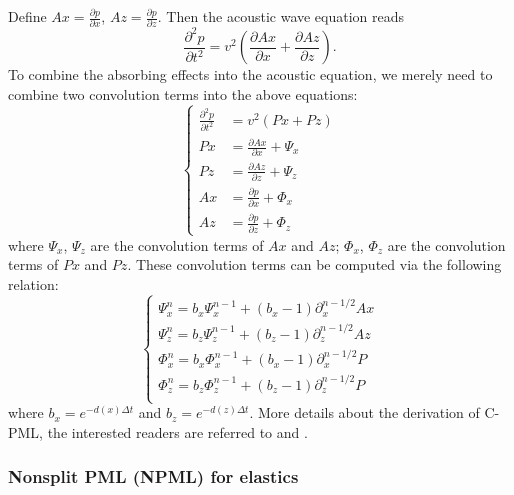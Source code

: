 Define $Ax=\frac{\partial p}{\partial x}$, $Az=\frac{\partial p}{\partial z}$. Then the acoustic wave equation reads
\begin{displaymath}
\frac{\partial^2 p}{\partial t^2}=v^2\left(\frac{\partial Ax}{\partial x}+\frac{\partial Az}{\partial z}\right).
\end{displaymath}
To combine the absorbing effects into the acoustic equation, we merely need to combine two convolution terms into the above equations:
\begin{equation}
\left\{
\begin{split}
\frac{\partial^2 p}{\partial t^2}&=v^2\left(Px+Pz\right)\\
Px&=\frac{\partial Ax}{\partial x}+\Psi_x\\
Pz&=\frac{\partial Az}{\partial z}+\Psi_z\\
Ax&=\frac{\partial p}{\partial x}+\Phi_x\\
Az&=\frac{\partial p}{\partial z}+\Phi_z
\end{split}
\right.
\end{equation}
where $\Psi_x$, $\Psi_z$ are the convolution terms of $Ax$ and $Az$; $\Phi_x$, $\Phi_z$ are the convolution terms of $Px$ and $Pz$. These convolution terms can be computed via the following relation:
\begin{equation}
\left\{
\begin{split}
\Psi_x^n=b_x \Psi_x^{n-1}+(b_x-1) \partial_x^{n-1/2}Ax\\
\Psi_z^n=b_z \Psi_z^{n-1}+(b_z-1) \partial_z^{n-1/2}Az\\
\Phi_x^n=b_x \Phi_x^{n-1}+(b_x-1) \partial_x^{n-1/2}P\\
\Phi_z^n=b_z \Phi_z^{n-1}+(b_z-1) \partial_z^{n-1/2}P\\
\end{split}
\right.
\end{equation}
where $b_x=e^{-d(x)\Delta t}$ and $b_z=e^{-d(z)\Delta t}$. More details about the derivation of C-PML, the interested readers are referred to \cite{collino2001application} and \cite{komatitsch2007unsplit}.

\subsubsection{Nonsplit PML (NPML) for elastics}

